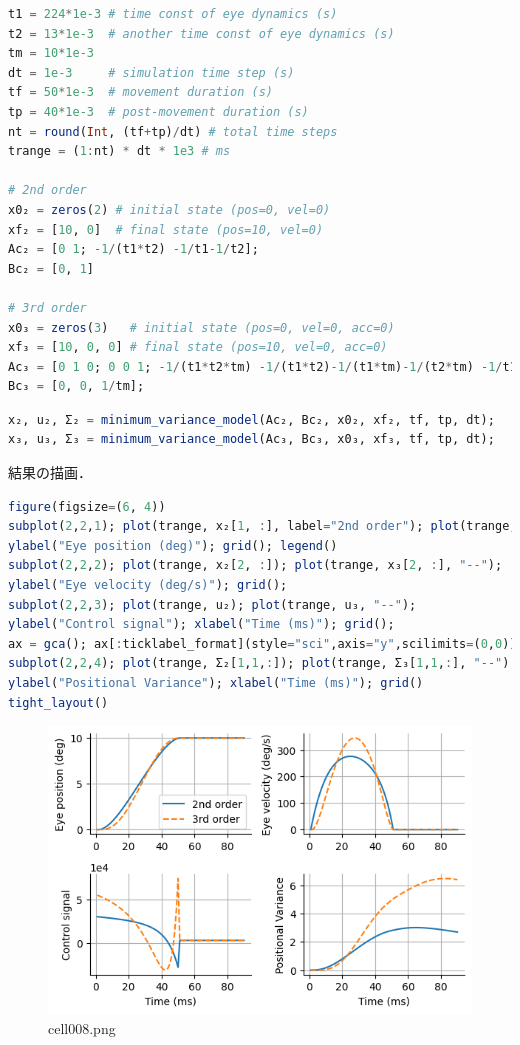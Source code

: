 \begin{lstlisting}[language=julia]
t1 = 224*1e-3 # time const of eye dynamics (s)
t2 = 13*1e-3  # another time const of eye dynamics (s)
tm = 10*1e-3
dt = 1e-3     # simulation time step (s)
tf = 50*1e-3  # movement duration (s)
tp = 40*1e-3  # post-movement duration (s)
nt = round(Int, (tf+tp)/dt) # total time steps
trange = (1:nt) * dt * 1e3 # ms

# 2nd order
x0₂ = zeros(2) # initial state (pos=0, vel=0)
xf₂ = [10, 0]  # final state (pos=10, vel=0)
Ac₂ = [0 1; -1/(t1*t2) -1/t1-1/t2];
Bc₂ = [0, 1]

# 3rd order
x0₃ = zeros(3)   # initial state (pos=0, vel=0, acc=0)
xf₃ = [10, 0, 0] # final state (pos=10, vel=0, acc=0)
Ac₃ = [0 1 0; 0 0 1; -1/(t1*t2*tm) -1/(t1*t2)-1/(t1*tm)-1/(t2*tm) -1/t1-1/t2-1/tm];
Bc₃ = [0, 0, 1/tm];
\end{lstlisting}
\begin{lstlisting}[language=julia]
x₂, u₂, Σ₂ = minimum_variance_model(Ac₂, Bc₂, x0₂, xf₂, tf, tp, dt);
x₃, u₃, Σ₃ = minimum_variance_model(Ac₃, Bc₃, x0₃, xf₃, tf, tp, dt);
\end{lstlisting}
結果の描画．
\begin{lstlisting}[language=julia]
figure(figsize=(6, 4))
subplot(2,2,1); plot(trange, x₂[1, :], label="2nd order"); plot(trange, x₃[1, :], "--", label="3rd order"); 
ylabel("Eye position (deg)"); grid(); legend()
subplot(2,2,2); plot(trange, x₂[2, :]); plot(trange, x₃[2, :], "--"); 
ylabel("Eye velocity (deg/s)"); grid();
subplot(2,2,3); plot(trange, u₂); plot(trange, u₃, "--");
ylabel("Control signal"); xlabel("Time (ms)"); grid();
ax = gca(); ax[:ticklabel_format](style="sci",axis="y",scilimits=(0,0))
subplot(2,2,4); plot(trange, Σ₂[1,1,:]); plot(trange, Σ₃[1,1,:], "--");
ylabel("Positional Variance"); xlabel("Time (ms)"); grid()
tight_layout()
\end{lstlisting}
\begin{figure}[ht]
	\centering
	\includegraphics[scale=0.8, max width=\linewidth]{./fig/motor-learning/minimum-variance/cell008.png}
	\caption{cell008.png}
	\label{cell008.png}
\end{figure}
